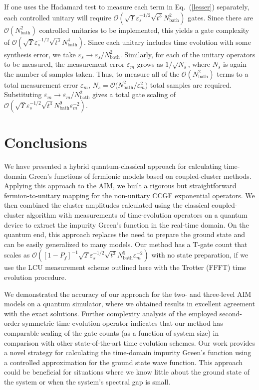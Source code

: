 \documentclass[aip,reprint,table,xcdraw,usenames,dvipsnames]{revtex4-1}
\begin{document}
If one uses the Hadamard test to measure each term in Eq.~(\ref{lesser}) separately, each controlled unitary will require $\mathcal{O}(\sqrt{\Upsilon} \varepsilon_s^{-1/2} \sqrt{t^3} N_{\text{bath}}^2)$ gates. Since there are $\mathcal{O}(N_{\text{bath}}^2)$ controlled unitaries to be implemented, this yields a gate complexity of $\mathcal{O}(\sqrt{\Upsilon} \varepsilon_s^{-1/2} \sqrt{t^3} N_{\text{bath}}^4)$. Since each unitary includes time evolution with some synthesis error, we take $\varepsilon_s \to \varepsilon_s/N_{\text{bath}}^2$. Similarly, for each of the unitary operators to be measured, the measurement error $\varepsilon_m$ grows as $1/\sqrt{N_s}$, where $N_s$ is again the number of samples taken. Thus, to measure all of the $\mathcal{O}(N_{\text{bath}}^2)$ terms to a total measurement error $\varepsilon_m$, $N_s = \mathcal{O} \Big( N_{\text{bath}}^2/\varepsilon_m^{2} \Big)$ total samples are required. Substituting $\varepsilon_m \to \varepsilon_m/N_{\text{bath}}^2$  gives a total gate scaling of $\mathcal{O}(
\sqrt{\Upsilon} \varepsilon_s^{-1/2} \sqrt{t^3} N_{\text{bath}}^9\varepsilon_m^{-2})$.





\section{Conclusions} \label{sec:conclusions}
%
We have presented a hybrid quantum-classical approach for calculating time-domain Green's functions of fermionic models based on coupled-cluster methods. Applying this approach to the AIM, we built a rigorous but straightforward fermion-to-unitary mapping for the non-unitary CCGF exponential operators. We then combined the cluster amplitudes calculated using the classical coupled-cluster algorithm with measurements of time-evolution operators on a quantum device to extract the impurity Green's function in the real-time domain. On the quantum end, this approach replaces the need to prepare the ground state and can be easily generalized to many models. Our method has a T-gate count that scales as $\mathcal{O}([1-P_f]^{-1} \sqrt{\Upsilon} \varepsilon_s^{-1/2} \sqrt{t^3} N_{\text{bath}}^5 \varepsilon_m^{-2})$ with no state preparation, if we use the LCU measurement scheme outlined here with the Trotter (FFFT) time evolution procedure. 

We demonstrated the accuracy of our approach for the two- and three-level AIM models on a quantum simulator, where we obtained results in excellent agreement with the exact solutions. Further complexity analysis of the employed second-order symmetric time-evolution operator indicates that our method has comparable scaling of the gate counts (as a function of system size) in comparison with other state-of-the-art time evolution schemes. Our work provides a novel strategy for calculating the time-domain impurity Green's function using a controlled approximation for the ground state wave function. This approach could be beneficial for situations where we know little about the ground state of the system or when the system's spectral gap is small. 
\end{document}
